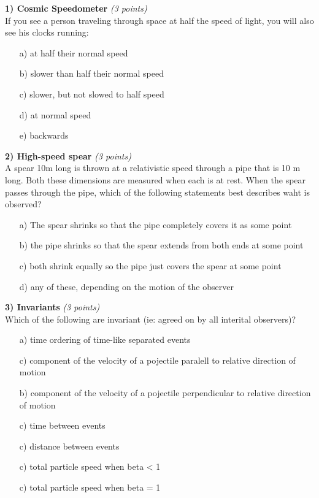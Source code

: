 {\large


\textbf{1) Cosmic Speedometer }\hfill \textit{(3 points)}\\
If you see a person traveling through space at half the speed of light, you will also see his clocks running:

\begin{itemize}
\item[a)] at half their normal speed
\item[b)] slower than half their normal speed
\item[c)] slower, but not slowed to half speed
\item[d)] at normal speed
\item[e)] backwards
\end{itemize}

\vspace{0.1in}

\textbf{2) High-speed spear }\hfill \textit{(3 points)}\\
A spear 10m long is thrown at a relativistic speed through a pipe that is 10 m long.
Both these dimensions are measured when each is at rest.
When the spear passes through the pipe, which of the following statements best describes waht is observed?
\begin{itemize}
\item[a)] The spear shrinks so that the pipe completely covers it as some point
\item[b)] the pipe shrinks so that the spear extends from both ends at some point
\item[c)] both shrink equally so the pipe just covers the spear at some point
\item[d)] any of these, depending on the motion of the observer
\end{itemize}


\textbf{3) Invariants }\hfill \textit{(3 points)}\\

Which of the following are invariant (ie: agreed on by all interital observers)?
\begin{itemize}
\item[a)] time ordering of time-like separated events
\item[c)] component of the velocity of a pojectile paralell to relative direction of motion
\item[b)] component of the velocity of a pojectile perpendicular to relative direction of motion
\item[c)] time between events
\item[c)] distance between events
\item[c)] total particle speed when beta < 1
\item[c)] total particle speed when beta = 1
\end{itemize}

}
